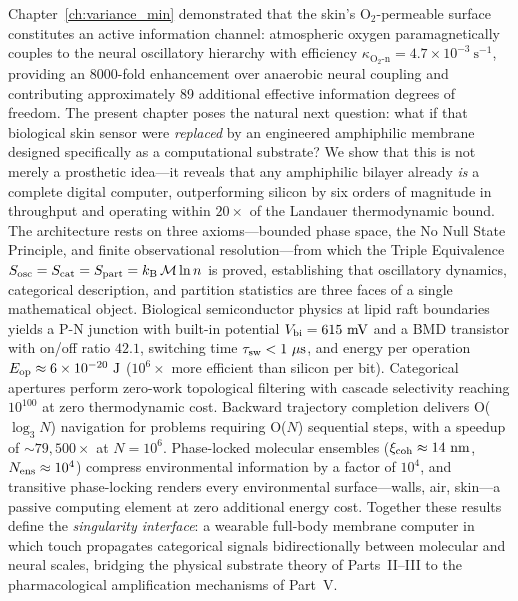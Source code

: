 \begin{chapterabstract}
Chapter~\ref{ch:variance_min} demonstrated that the skin's O$_2$-permeable surface constitutes an active information channel: atmospheric oxygen paramagnetically couples to the neural oscillatory hierarchy with efficiency $\kappa_{\mathrm{O_2\text{-}n}} = 4.7 \times 10^{-3}\ \mathrm{s}^{-1}$, providing an 8000-fold enhancement over anaerobic neural coupling and contributing approximately 89 additional effective information degrees of freedom. The present chapter poses the natural next question: what if that biological skin sensor were \emph{replaced} by an engineered amphiphilic membrane designed specifically as a computational substrate? We show that this is not merely a prosthetic idea---it reveals that any amphiphilic bilayer already \emph{is} a complete digital computer, outperforming silicon by six orders of magnitude in throughput and operating within $20\times$ of the Landauer thermodynamic bound. The architecture rests on three axioms---bounded phase space, the No Null State Principle, and finite observational resolution---from which the Triple Equivalence $S_{\mathrm{osc}} = S_{\mathrm{cat}} = S_{\mathrm{part}} = k_{\mathrm{B}}\,\mathcal{M}\ln n$ is proved, establishing that oscillatory dynamics, categorical description, and partition statistics are three faces of a single mathematical object. Biological semiconductor physics at lipid raft boundaries yields a P-N junction with built-in potential $V_{\mathrm{bi}} = 615\ \mathrm{mV}$ and a BMD transistor with on/off ratio $42.1$, switching time $\tausw < 1\ \mu\mathrm{s}$, and energy per operation $E_{\mathrm{op}} \approx 6 \times 10^{-20}\ \mathrm{J}$ ($10^6\times$ more efficient than silicon per bit). Categorical apertures perform zero-work topological filtering with cascade selectivity reaching $10^{100}$ at zero thermodynamic cost. Backward trajectory completion delivers O($\log_3 N$) navigation for problems requiring O($N$) sequential steps, with a speedup of $\sim 79{,}500\times$ at $N = 10^6$. Phase-locked molecular ensembles ($\xi_{\mathrm{coh}} \approx 14\ \mathrm{nm}$, $N_{\mathrm{ens}} \approx 10^4$) compress environmental information by a factor of $10^4$, and transitive phase-locking renders every environmental surface---walls, air, skin---a passive computing element at zero additional energy cost. Together these results define the \emph{singularity interface}: a wearable full-body membrane computer in which touch propagates categorical signals bidirectionally between molecular and neural scales, bridging the physical substrate theory of Parts~II--III to the pharmacological amplification mechanisms of Part~V.
\end{chapterabstract}

